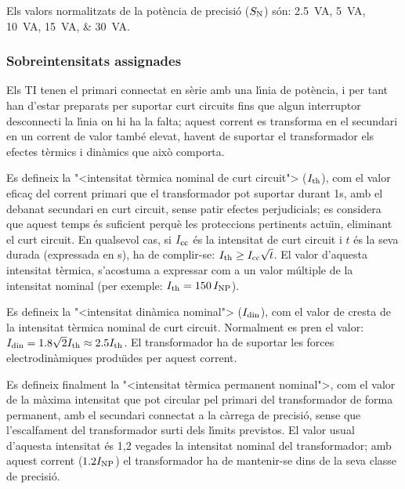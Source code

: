  Els valors normalitzats de la pot\`{e}ncia de precisi\'{o}
 ($S_\mathrm{N}$) s\'{o}n: \SIlist{2,5; 5;10; 15; 30}{VA}.

\subsubsection{Sobreintensitats  assignades}

 Els TI
tenen el primari connectat en s\`{e}rie amb una l\'{\i}nia de pot\`{e}ncia, i per tant han
d'estar preparats per suportar curt circuits fins que algun
interruptor desconnecti la l\'{\i}nia on hi ha la falta; aquest
corrent es transforma en el secundari en un corrent de valor
tamb\'{e} elevat, havent de suportar el transformador els efectes t\`{e}rmics
i din\`{a}mics que aix\`{o} comporta.

Es defineix la {"<}intensitat t\`{e}rmica nominal de curt circuit{">}
($I_\mathrm{th}$), com el valor efica\c{c} del  corrent primari que el
transformador pot suportar durant 1\unit{s}, amb el debanat
secundari en curt circuit, sense patir efectes perjudicials; es
considera que aquest temps \'{e}s suficient perqu\`{e} les proteccions
pertinents actu\"{\i}n, eliminant el curt circuit. En qualsevol cas, si
$I_\mathrm{cc}$ \'{e}s la intensitat de curt circuit i $t$ \'{e}s la seva durada
(expressada en s), ha de complir-se: $I_\mathrm{th}\geq
I_\mathrm{cc}\sqrt{t}$. El valor d'aquesta intensitat t\`{e}rmica,
s'acostuma a expressar com a un valor m\'{u}ltiple de la intensitat
nominal (per exemple: $I_\mathrm{th}=150\,I_\mathrm{NP}$).

Es defineix la {"<}intensitat din\`{a}mica nominal{">} ($I_\mathrm{din}$), com el
valor de cresta de la intensitat t\`{e}rmica nominal de curt circuit.
Normalment es pren el valor: $I_\mathrm{din} =
\num{1,8}\sqrt{2}I_\mathrm{th}\approx \num{2,5}I_\mathrm{th}$. El transformador ha de
suportar les forces electrodin\`{a}miques produ\"{\i}des per aquest corrent.

Es defineix finalment la {"<}intensitat t\`{e}rmica permanent nominal{">}, com
el valor de la m\`{a}xima intensitat que pot circular pel primari del
transformador  de forma permanent, amb el secundari connectat a la
c\`{a}rrega de precisi\'{o}, sense que l'escalfament del transformador surti
dels l\'{\i}mits previstos. El valor usual d'aquesta intensitat \'{e}s 1,2
vegades la intensitat nominal del transformador; amb aquest corrent
($\num{1,2}I_\mathrm{NP}$)  el transformador ha de mantenir-se dins de la
seva classe de precisi\'{o}.


